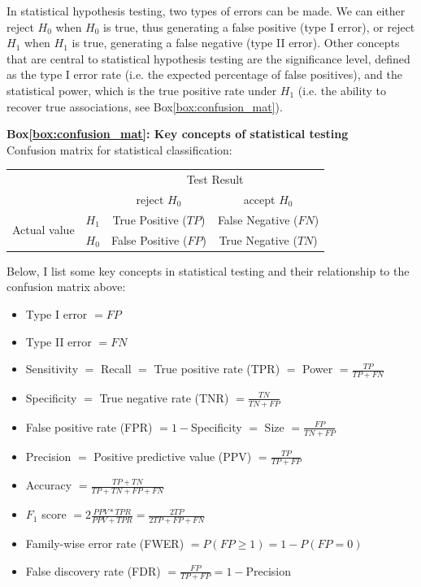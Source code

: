 In statistical hypothesis testing, two types of errors can be made. 
We can either reject $H_0$ when $H_0$ is true, thus generating a false positive (type I error), or reject $H_1$ when $H_1$ is true, generating a false negative (type II error).
Other concepts that are central to statistical hypothesis testing are the significance level, defined as the type I error rate (i.e. the expected percentage of false positives), and the statistical power, which is the true positive rate under $H_1$ (i.e. the ability to recover true associations, see Box\ref{box:confusion_mat}).


\newpage

\begin{Comment}
\hspace{-2.5mm}\textbf{Box\ref{box:confusion_mat}: Key concepts of statistical testing}\label{box:confusion_mat}\\
Confusion matrix for statistical classification:

\begin{center}
\begin{tabular}{l|l|c|c|}
\multicolumn{2}{c}{}&\multicolumn{2}{c}{Test Result}\\
\cline{3-4}
\multicolumn{2}{c|}{}&reject $H_0$&accept $H_0$\\
\cline{2-4}
\multirow{2}{*}{Actual value}& $H_1$ & True Positive ($TP$) & False Negative ($FN$)\\
\cline{2-4}
& $H_0$ & False Positive ($FP$) & True Negative ($TN$)\\
\cline{2-4}
\end{tabular}
\end{center}

\vspace{3mm}
Below, I list some key concepts in statistical testing and their relationship to the confusion matrix above:

\begin{itemize}
    \item Type I error $= FP$
    \item Type II error $= FN$
    \item Sensitivity $=$ Recall $=$ True positive rate (TPR) $=$ Power $=\frac{TP}{TP+FN}$
    \item Specificity $=$ True negative rate (TNR) $=\frac{TN}{TN+FP}$
    \item False positive rate (FPR) $= 1-$Specificity $=$ Size $=\frac{FP}{TN+FP}$
    \item Precision $=$ Positive predictive value (PPV) $=\frac{TP}{TP+FP}$
    \item Accuracy $=\frac{TP+TN}{TP+TN+FP+FN}$
    \item $F_1$ score $=2 \frac{PPV*TPR}{PPV+TPR}=\frac{2TP}{2TP+FP+FN}$
    \item Family-wise error rate (FWER) $=P(FP \geq 1)= 1 - P(FP=0)$
    \item False discovery rate (FDR) $=\frac{FP}{TP+FP}= 1- $Precision
\end{itemize}

\vfill

\end{Comment}

